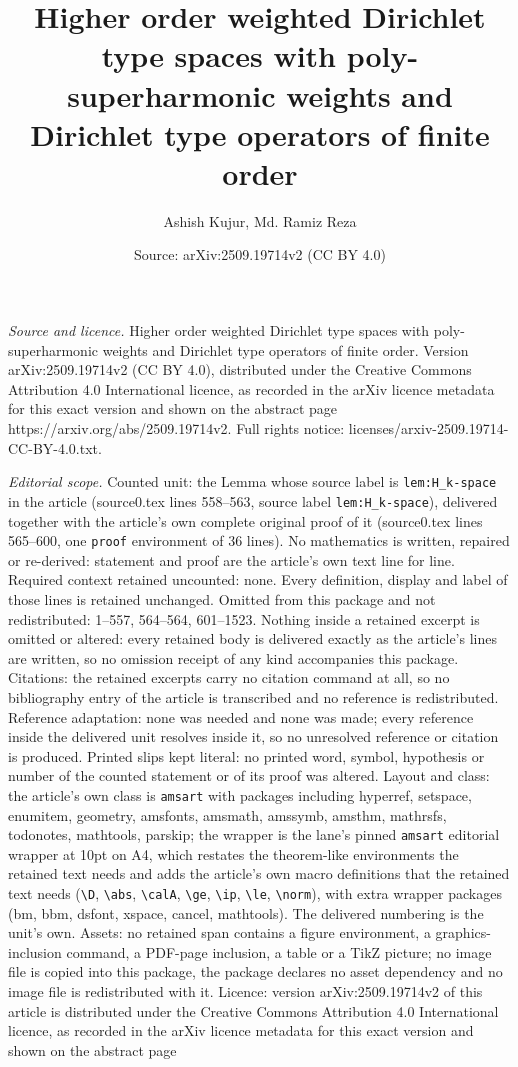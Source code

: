 \documentclass[10pt,a4paper]{amsart}
\title[Higher order weighted Dirichlet type spaces with poly-superh]{Higher order weighted Dirichlet type spaces with poly-superharmonic weights and Dirichlet type operators of finite order}
\author{Ashish Kujur, Md. Ramiz Reza}
\date{Source: arXiv:2509.19714v2 (CC BY 4.0)}
\begin{document}
\maketitle

\noindent\emph{Source and licence.} Higher order weighted Dirichlet type spaces with poly-superharmonic weights and Dirichlet type operators of finite order. Version arXiv:2509.19714v2 (CC BY 4.0), distributed under the Creative Commons Attribution 4.0 International licence, as recorded in the arXiv licence metadata for this exact version and shown on the abstract page https://arxiv.org/abs/2509.19714v2. Full rights notice: licenses/arxiv-2509.19714-CC-BY-4.0.txt.\par\smallskip

\noindent\textit{Editorial scope.} Counted unit: the Lemma whose source label is \texttt{lem:H\_k-space} in the article (source0.tex lines 558--563, source label \texttt{lem:H\_k-space}), delivered together with the article's own complete original proof of it (source0.tex lines 565--600, one \texttt{proof} environment of 36 lines). No mathematics is written, repaired or re-derived: statement and proof are the article's own text line for line. Required context retained uncounted: none. Every definition, display and label of those lines is retained unchanged. Omitted from this package and not redistributed: 1--557, 564--564, 601--1523. Nothing inside a retained excerpt is omitted or altered: every retained body is delivered exactly as the article's lines are written, so no omission receipt of any kind accompanies this package. Citations: the retained excerpts carry no citation command at all, so no bibliography entry of the article is transcribed and no reference is redistributed. Reference adaptation: none was needed and none was made; every reference inside the delivered unit resolves inside it, so no unresolved reference or citation is produced. Printed slips kept literal: no printed word, symbol, hypothesis or number of the counted statement or of its proof was altered. Layout and class: the article's own class is \texttt{amsart} with packages including hyperref, setspace, enumitem, geometry, amsfonts, amsmath, amssymb, amsthm, mathrsfs, todonotes, mathtools, parskip; the wrapper is the lane's pinned \texttt{amsart} editorial wrapper at 10pt on A4, which restates the theorem-like environments the retained text needs and adds the article's own macro definitions that the retained text needs (\texttt{\textbackslash D}, \texttt{\textbackslash abs}, \texttt{\textbackslash calA}, \texttt{\textbackslash ge}, \texttt{\textbackslash ip}, \texttt{\textbackslash le}, \texttt{\textbackslash norm}), with extra wrapper packages (bm, bbm, dsfont, xspace, cancel, mathtools). The delivered numbering is the unit's own. Assets: no retained span contains a figure environment, a graphics-inclusion command, a PDF-page inclusion, a table or a TikZ picture; no image file is copied into this package, the package declares no asset dependency and no image file is redistributed with it. Licence: version arXiv:2509.19714v2 of this article is distributed under the Creative Commons Attribution 4.0 International licence, as recorded in the arXiv licence metadata for this exact version and shown on the abstract page 
\end{document}
